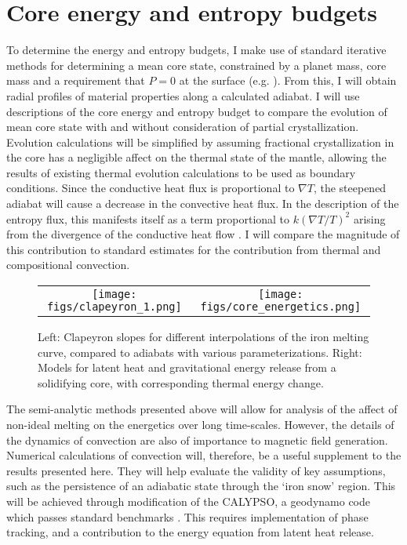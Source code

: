 \section{Core energy and entropy budgets}

To determine the energy and entropy budgets, I make use of standard iterative
methods for determining a mean core state, constrained by a planet mass, core
mass and a requirement that $P=0$ at the surface (e.g. \citet{Lister1995}). From
this, I will obtain radial profiles of material properties along a calculated
adiabat.  I will use descriptions of the core energy and entropy budget
\citep{Gubbins1979,Lister1995,Lister2003} to compare the evolution of mean core state
with and without consideration of partial crystallization. Evolution
calculations will be simplified by assuming fractional crystallization in the
core has a negligible affect on the thermal state of the mantle, allowing the
results of existing thermal evolution calculations \citep{Hauck2004,Breuer2007} to
be used as boundary conditions. Since the conductive heat flux is proportional
to $\nabla T$, the steepened adiabat will cause a decrease in the convective
heat flux. In the description of the entropy flux, this manifests itself as a
term proportional to $k\left(\nabla T / T \right)^2$ arising from the
divergence of the conductive heat flow \citep{Lister2003}. I will compare the
magnitude of this contribution to standard estimates for the contribution from
thermal and compositional convection.


 \begin{figure}[h] %
   \centering
\begin{tabular}{cc}
 \texttt{[image: figs/clapeyron\_1.png]} &
 \texttt{[image: figs/core\_energetics.png]} \\
\end{tabular}
\caption{Left: Clapeyron slopes for different interpolations of the iron
melting curve, compared to adiabats with various parameterizations.  Right:  Models
for latent heat and gravitational energy release from a solidifying core, with
corresponding thermal energy change.}
\label{fig:core_energy}
\end{figure}

The semi-analytic methods presented above will allow for analysis of the
affect of non-ideal melting on the energetics over long time-scales. However,
the details of the dynamics of convection are also of importance to magnetic field
generation. Numerical calculations of convection will, therefore, be a useful
supplement to the results presented here. They will help evaluate the validity of
key assumptions, such as the persistence of an adiabatic state through the
`iron snow' region. This will be achieved through modification of the CALYPSO,
a geodynamo code which passes standard benchmarks \citep{Christensen2001}. This
requires implementation of phase tracking, and a contribution to the energy
equation from latent heat release. 



